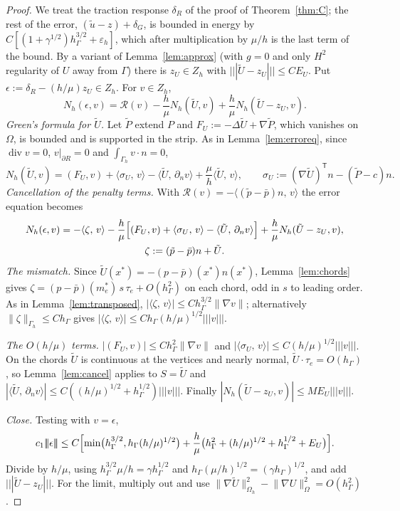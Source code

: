 \documentclass[pdflatex,sn-mathphys-num]{sn-jnl}
\theoremstyle{thmstyleone}
\theoremstyle{thmstylethree}
\newcommand{\hG}{h_\Gamma}
\newcommand{\Gh}{\Gamma_h}
\newcommand{\Oh}{\Omega_h}
\newcommand{\Zh}{Z_h}
\newcommand{\dn}{\partial_n}
\newcommand{\ut}{\tilde u}
\newcommand{\pt}{\tilde p}
\newcommand{\pbar}{\bar p}
\newcommand{\ip}[2]{\langle #1,\, #2\rangle}
\newcommand{\tnorm}[1]{|\!|\!|#1|\!|\!|}
\newcommand{\norm}[1]{\lVert #1\rVert}
\newcommand{\eps}{\varepsilon_h}
\renewcommand{\div}{\operatorname{div}}
\newcommand{\Rc}{\mathcal R}
\begin{document}
\begin{proof}
We treat the traction response $\delta_R$ of the proof of Theorem~\ref{thm:C}; the rest of the error, $(\ut-z)+\delta_G$, is bounded in energy by $C[(1+\gamma^{1/2})\hG^{3/2}+\eps]$, which after multiplication by $\mu/h$ is the last term of the bound. By a variant of Lemma~\ref{lem:approx} (with $g=0$ and only $H^2$ regularity of $U$ away from $\Gamma$) there is $z_U\in\Zh$ with $\tnorm{\tilde U-z_U}\le CE_U$. Put $\epsilon:=\delta_R-(h/\mu)z_U\in\Zh$. For $v\in\Zh$,
\[
N_h(\epsilon,v)=\Rc(v)-\frac h\mu N_h(\tilde U,v)+\frac h\mu N_h(\tilde U-z_U,v).
\]
\emph{Green's formula for $\tilde U$.} Let $\tilde P$ extend $P$ and $F_U:=-\Delta\tilde U+\nabla\tilde P$, which vanishes on $\Omega$, is bounded and is supported in the strip. As in Lemma~\ref{lem:erroreq}, since $\div v=0$, $v|_{\partial R}=0$ and $\int_{\Gh}v\cdot n=0$,
\[
N_h(\tilde U,v)=(F_U,v)+\ip{\sigma_U}{v}-\ip{\tilde U}{\dn v}+\frac\mu h\ip{\tilde U}{v},\qquad\sigma_U:=(\nabla\tilde U)^{\mathsf T}n-(\tilde P-c)n .
\]
\emph{Cancellation of the penalty terms.} With $\Rc(v)=-\ip{(\pt-\pbar)n}{v}$ the error equation becomes
\begin{gather*}
N_h(\epsilon,v)=-\ip{\zeta}{v}-\frac h\mu\Bigl[(F_U,v)+\ip{\sigma_U}{v}-\ip{\tilde U}{\dn v}\Bigr]+\frac h\mu N_h(\tilde U-z_U,v),\\
\zeta:=(\pt-\pbar)n+\tilde U .
\end{gather*}
\emph{The mismatch.} Since $\tilde U(x^\ast)=-(p-\pbar)(x^\ast)n(x^\ast)$, Lemma~\ref{lem:chords} gives $\zeta=(p-\pbar)(m_e^\ast)\,s\,\tau_e+O(\hG^2)$ on each chord, odd in $s$ to leading order. As in Lemma~\ref{lem:transposed}, $|\ip{\zeta}{v}|\le C\hG^{3/2}\norm{\nabla v}$; alternatively $\norm{\zeta}_{\Gh}\le C\hG$ gives $|\ip{\zeta}{v}|\le C\hG(h/\mu)^{1/2}\tnorm v$.

\emph{The $O(h/\mu)$ terms.} $|(F_U,v)|\le C\hG^2\norm{\nabla v}$ and $|\ip{\sigma_U}{v}|\le C(h/\mu)^{1/2}\tnorm v$. On the chords $\tilde U$ is continuous at the vertices and nearly normal, $\tilde U\cdot\tau_e=O(\hG)$, so Lemma~\ref{lem:cancel} applies to $S=\tilde U$ and $|\ip{\tilde U}{\dn v}|\le C((h/\mu)^{1/2}+\hG^{1/2})\tnorm v$. Finally $|N_h(\tilde U-z_U,v)|\le ME_U\tnorm v$.

\emph{Close.} Testing with $v=\epsilon$,
\[
c_1\tnorm{\epsilon}\le C\Bigl[\min\bigl(\hG^{3/2},\hG(h/\mu)^{1/2}\bigr)+\frac h\mu\bigl(\hG^2+(h/\mu)^{1/2}+\hG^{1/2}+E_U\bigr)\Bigr].
\]
Divide by $h/\mu$, using $\hG^{3/2}\mu/h=\gamma\hG^{1/2}$ and $\hG(\mu/h)^{1/2}=(\gamma\hG)^{1/2}$, and add $\tnorm{\tilde U-z_U}$. For the limit, multiply out and use $\norm{\nabla\tilde U}^2_{\Oh}-\norm{\nabla U}^2_\Omega=O(\hG^2)$.
\end{proof}
\end{document}
